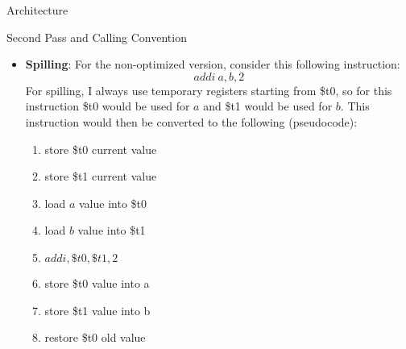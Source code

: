 \documentclass[letterpaper,12pt]{article}
\theoremstyle{definition}
\begin{document}
\begin{section}{Architecture}
\begin{subsection}{Second Pass and Calling Convention}
\begin{itemize}
\begin{center}
\begin{tabular}{| c | c |}
                        \end{tabular}
                    \end{center}
                    Most of the things stored on this stack is standard, but there are a few things that merits some discussion:
                    \begin{itemize}
                        \item \textbf{Argument registers}: Consider a scenario where \(foo()\) is calling another function \(bar()\). When \textit{foo} calls \textit{bar}, it needs to pass arguments through the argument registers, but \textit{foo} itself might still need them after the call to \textit{bar} returns. Therefore, there needs to be a place to store argument register values before and after calls. This is also one of the places where the first pass inserts fake instructions to indicate where the store and restore happens.
                        \item \textbf{Array}: In this project, I am storing arrays on the heap, but I do not reclaim the memory, so there will be memory leak in a realistic application.
                        \item \textbf{\$ra}: This is not stored for the \textit{main} function since it doesn't need to return to another function.
                    \end{itemize}
                \item \textbf{Spilling}: For the non-optimized version, consider this following instruction:
                    \[addi \ a, b, 2\]
                    For spilling, I always use temporary registers starting from \$t0, so for this instruction \$t0 would be used for $a$ and \$t1 would be used for $b$. This instruction would then be converted to the following (pseudocode):
                    \begin{enumerate}
                        \item store \$t0 current value
                        \item store \$t1 current value
                        \item load $a$ value into \$t0
                        \item load $b$ value into \$t1
                        \item \(addi, \$t0, \$t1, 2\)
                        \item store \$t0 value into a
                        \item store \$t1 value into b
                        \item restore \$t0 old value

\end{enumerate}
\end{itemize}
\end{subsection}
\end{section}
\end{document}
